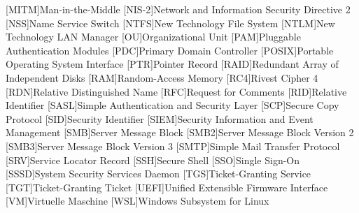 \begin{acronym}
	[MITM]{Man-in-the-Mid\-dle}
	[NIS-2]{Net\-work and In\-for\-ma\-ti\-on Se\-cu\-ri\-ty Di\-rec\-tive 2}
	[NSS]{Name Ser\-vice Switch}
	[NTFS]{New Tech\-no\-lo\-gy File Sys\-tem}
	[NTLM]{New Tech\-no\-lo\-gy LAN Ma\-na\-ger}
	[OU]{Or\-ga\-ni\-za\-tio\-nal U\-nit}
	[PAM]{Plug\-ga\-ble Au\-then\-ti\-ca\-ti\-on Mo\-dules}
	[PDC]{Pri\-ma\-ry Do\-main Con\-trol\-ler}
	[POSIX]{Por\-ta\-ble Ope\-ra\-ting Sys\-tem In\-ter\-face}
	[PTR]{Poin\-ter Re\-cord}
	[RAID]{Re\-dun\-dant Ar\-ray of In\-de\-pen\-dent Disks}
	[RAM]{Ran\-dom-Ac\-cess Me\-mo\-ry}
	[RC4]{Ri\-vest Ci\-pher 4}
	[RDN]{Re\-la\-tive Dis\-tin\-guished Name}
	[RFC]{Re\-quest for Com\-ments}
	[RID]{Re\-la\-tive Iden\-ti\-fier}
	[SASL]{Sim\-ple Au\-then\-ti\-ca\-ti\-on and Se\-cu\-ri\-ty Lay\-er}
	[SCP]{Se\-cure Co\-py Pro\-to\-col}
	[SID]{Se\-cu\-ri\-ty Iden\-ti\-fier}
	[SIEM]{Se\-cu\-ri\-ty In\-for\-ma\-ti\-on and Event Ma\-nage\-ment}
	[SMB]{Ser\-ver Mes\-sage Block}
	[SMB2]{Ser\-ver Mes\-sage Block Ver\-si\-on 2}
	[SMB3]{Ser\-ver Mes\-sage Block Ver\-si\-on 3}
	[SMTP]{Sim\-ple Mail Trans\-fer Pro\-to\-col}
	[SRV]{Ser\-vice Lo\-ca\-tor Re\-cord}
	[SSH]{Se\-cure Shell}
	[SSO]{Sin\-gle Sign-On}
	[SSSD]{Sys\-tem Se\-cu\-ri\-ty Ser\-vices Dae\-mon}
	[TGS]{Ti\-cket-Gran\-ting Ser\-vice}
	[TGT]{Ti\-cket-Gran\-ting Ti\-cket}
	[UEFI]{U\-ni\-fied Ex\-ten\-si\-ble Firm\-ware In\-ter\-face}
	[VM]{Vir\-tu\-el\-le Ma\-schi\-ne}
	[WSL]{Win\-dows Sub\-sys\-tem for Li\-nux}
\end{acronym}
